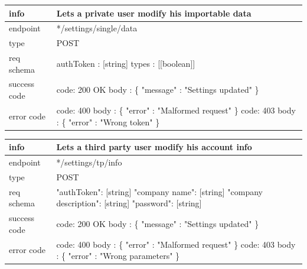 \documentclass[titlepage]{article}
\begin{document}
\vspace{\baselineskip}

\begin{tabularx}{\textwidth}{lX} \hline
    info & Lets a private user modify his importable data \\ \hline
    endpoint & */settings/single/data \\ \hline
    type & POST \\ \hline
    req schema & 
        authToken : [string] \newline
        types : [[boolean]] \\ \hline
    success code &
        code: 200 OK \newline \newline 
        body : \{ \newline
        "message" : "Settings updated" \newline
        \} \\ \hline
    error code &
        code: 400 \newline
        body : \{ "error" : "Malformed request" \} \newline \newline
        code: 403 \newline
        body : \{ "error" : "Wrong token" \} \\ \hline
\end{tabularx}
		
\vspace{\baselineskip}

\begin{tabularx}{\textwidth}{lX} \hline
    info & Lets a third party user modify his account info \\ \hline
    endpoint & */settings/tp/info \\ \hline
    type & POST \\ \hline
    req schema & 
    "authToken": [string] \newline
    "company name": [string] \newline
    "company description": [string] \newline
    "password": [string] \\ \hline
    success code &
        code: 200 OK \newline \newline 
        body : \{ \newline
        "message" : "Settings updated" \newline
        \} \\ \hline
    error code &
        code: 400 \newline
        body : \{ "error" : "Malformed request" \} \newline \newline
        code: 403 \newline
        body : \{ "error" : "Wrong parameters" \} \\ \hline
\end{tabularx}
		
\end{document}
